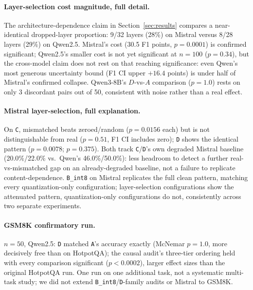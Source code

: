 \documentclass[11pt]{article}
\begin{document}
\paragraph{Layer-selection cost magnitude, full detail.} The
architecture-dependence claim in Section~\ref{sec:results} compares a
near-identical dropped-layer proportion: 9/32 layers (28\%) on Mistral
versus 8/28 layers (29\%) on Qwen2.5. Mistral's cost (30.5 F1 points,
$p=0.0001$) is confirmed significant; Qwen2.5's smaller cost is not yet
significant at $n=100$ ($p=0.34$), but the cross-model claim does not
rest on that reaching significance: even Qwen's most generous
uncertainty bound (F1 CI upper $+16.4$ points) is under half of
Mistral's confirmed collapse. Qwen3-8B's $D$-vs-$A$ comparison ($p=1.0$)
rests on only 3 discordant pairs out of 50, consistent with noise
rather than a real effect.

\paragraph{Mistral layer-selection, full explanation.} On \texttt{C},
mismatched beats zeroed/random ($p=0.0156$ each) but is not
distinguishable from real ($p=0.51$, F1 CI includes zero); \texttt{D}
shows the identical pattern ($p=0.0078$; $p=0.375$). Both track
\texttt{C}/\texttt{D}'s own degraded Mistral baseline (20.0\%/22.0\%
vs.\ Qwen's 46.0\%/50.0\%): less headroom to detect a further
real-vs-mismatched gap on an already-degraded baseline, not a failure
to replicate content-dependence. \texttt{B\_int8} on Mistral replicates
the full clean pattern, matching every quantization-only configuration;
layer-selection configurations show the attenuated pattern,
quantization-only configurations do not, consistently across two
separate experiments.

\paragraph{GSM8K confirmatory run.} $n=50$, Qwen2.5: \texttt{D} matched
\texttt{A}'s accuracy exactly (McNemar $p=1.0$, more decisively free
than on HotpotQA); the causal audit's three-tier ordering held with
every comparison significant ($p<0.0002$), larger effect sizes than the
original HotpotQA run. One run on one additional task, not a systematic
multi-task study; we did not extend \texttt{B\_int8}/\texttt{D}-family
audits or Mistral to GSM8K.
\end{document}
